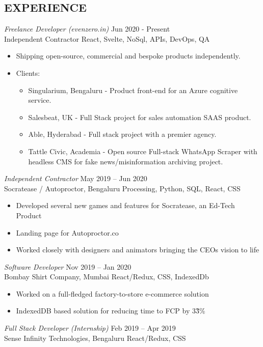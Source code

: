 \documentclass[margin, 10pt]{res} %
\begin{document}
\begin{resume}
\section{EXPERIENCE}
{\sl Freelance Developer (evenzero.in)} \hfill Jun 2020 - Present \\
 Independent Contractor \hfill React, Svelte, NoSql, APIs, DevOps, QA
\begin{itemize}
\item Shipping open-source, commercial and bespoke products independently.
\item Clients:
\begin{itemize}
\item Singularium, Bengaluru - Product front-end for an Azure cognitive service.
\item Salesbeat, UK - Full Stack project for sales automation SAAS product.
\item Able, Hyderabad - Full stack project with a premier agency.
\item Tattle Civic, Academia - Open source Full-stack WhatsApp Scraper with headless CMS for fake news/misinformation archiving project. 
\end{itemize}
\end{itemize}
{\sl Independent Contractor} \hfill May 2019 – Jun 2020 \\
Socratease / Autoproctor, Bengaluru \hfill Processing, Python, SQL, React, CSS
\begin{itemize}
\item Developed several new games and features for Socratease, an Ed-Tech Product
\item Landing page for Autoproctor.co
\item Worked closely with designers and animators bringing the CEOs vision to life 
\end{itemize}
{\sl Software Developer} \hfill Nov 2019 – Jan 2020 \\
Bombay Shirt Company, Mumbai \hfill React/Redux, CSS, IndexedDb
\begin{itemize}
\item Worked on a full-fledged factory-to-store e-commerce solution
\item IndexedDB based solution for reducing time to FCP by 3\~3\%
\end{itemize}
{\sl Full Stack Developer (Internship)} \hfill Feb 2019 – Apr 2019 \\
Sense Infinity Technologies, Bengaluru \hfill React/Redux, CSS


\end{resume}
\end{document}
